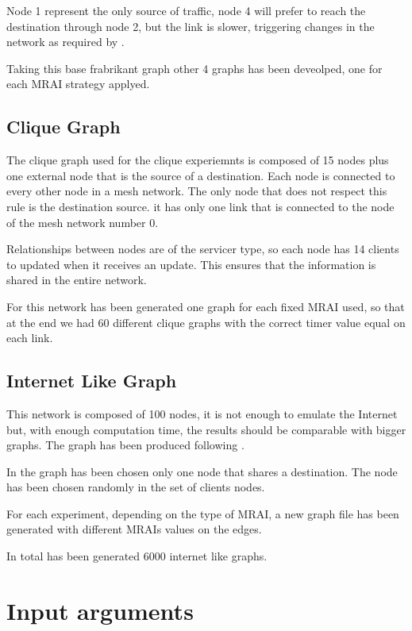 \documentclass[10pt,conference,letterpaper]{IEEEtran}
\begin{document}
Node 1 represent the only source of traffic, node 4 will prefer to reach the 
destination through node 2, but the link is slower, triggering changes in the
network as required by \cite{fabrikant}.

Taking this base frabrikant graph other 4 graphs has been deveolped, one for each
\ac{MRAI} strategy applyed.

\subsection{Clique Graph}
\label{subsec:clique_graph}

The clique graph used for the clique experiemnts is composed of \num{15} nodes
plus one external node that is the source of a destination.
Each node is connected to every other node in a mesh network. The only node that
does not respect this rule is the destination source. it has only one link 
that is connected to the node of the mesh network number \num{0}.

Relationships between nodes are of the servicer type, so each node has \num{14}
clients to updated when it receives an update.
This ensures that the information is shared in the entire network.

For this network has been generated one graph for each fixed \ac{MRAI} used, so
that at the end we had \num{60} different clique graphs with the correct timer value
equal on each link.

\subsection{Internet Like Graph}
\label{subsec:internet_graph}

This network is composed of \num{100} nodes, it is not enough to emulate the Internet
but, with enough computation time, the results should be comparable with bigger graphs.
The graph has been produced following \cite{elmokashfi}.

In the graph has been chosen only one node that shares a destination.
The node has been chosen randomly in the set of clients nodes.

For each experiment, depending on the type of \ac{MRAI}, a new graph file has
been generated with different MRAIs values on the edges.

In total has been generated \num{6000} internet like graphs.

\section{Input arguments}
\label{sec:envDesc}
\end{document}
